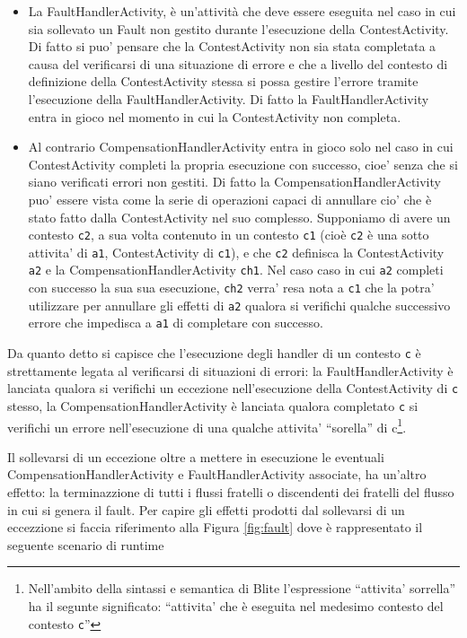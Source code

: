 \begin{itemize}
  \item La FaultHandlerActivity, \`e un'attivit\`a che deve essere eseguita nel
  caso in cui sia sollevato un Fault non gestito 
  durante l'esecuzione della ContestActivity. Di fatto si puo' pensare che la
  ContestActivity non sia stata completata a causa del verificarsi di una 
  situazione di errore e che a livello del contesto di definizione della 
  ContestActivity stessa si possa gestire l'errore tramite l'esecuzione della 
  FaultHandlerActivity. Di fatto la FaultHandlerActivity entra in gioco nel
  momento in cui la ContestActivity non completa.
  
  \item Al contrario CompensationHandlerActivity entra in gioco solo nel caso
  in cui ContestActivity completi la propria esecuzione con successo, cioe'
  senza che si siano verificati errori non gestiti. Di fatto la
  CompensationHandlerActivity puo' essere vista come la serie di operazioni
  capaci di annullare cio' che \`e stato fatto dalla ContestActivity nel suo
  complesso. 
  Supponiamo di avere un contesto \texttt{c2}, a sua volta
  contenuto in un contesto \texttt{c1} (cio\`e \texttt{c2} \`e una sotto
  attivita' di \texttt{a1}, ContestActivity di \texttt{c1}), e che
  \texttt{c2} definisca la ContestActivity \texttt{a2} e la CompensationHandlerActivity
  \texttt{ch1}. Nel caso caso in cui \texttt{a2} completi con successo la sua
  sua esecuzione, \texttt{ch2} verra' resa nota a \texttt{c1} che la potra'
  utilizzare per annullare gli effetti di \texttt{a2} qualora si verifichi
  qualche successivo errore che impedisca a \texttt{a1} di completare con
  successo.
   
\end{itemize}

Da quanto detto si capisce che l'esecuzione degli handler di un contesto
\texttt{c} \`e strettamente legata al verificarsi di situazioni di errori:
la FaultHandlerActivity \`e lanciata qualora si verifichi un eccezione
nell'esecuzione della ContestActivity di \texttt{c} stesso, la
CompensationHandlerActivity \`e lanciata qualora completato \texttt{c} si
verifichi un errore nell'esecuzione di una qualche attivita' ``sorella'' di
c\footnote{Nell'ambito della sintassi e semantica di Blite l'espressione
``attivita' sorrella'' ha il segunte significato: ``attivita' che \`e eseguita
nel medesimo contesto del contesto \texttt{c}''}.

Il sollevarsi di un eccezione oltre a mettere in esecuzione le eventuali
CompensationHandlerActivity e FaultHandlerActivity associate, ha un'altro
effetto: la terminazzione di tutti i flussi fratelli o discendenti dei fratelli
del flusso in cui si genera il fault. Per capire gli effetti prodotti dal
sollevarsi di un eccezzione si faccia riferimento alla Figura \ref{fig:fault}
dove \`e rappresentato il seguente scenario di runtime

